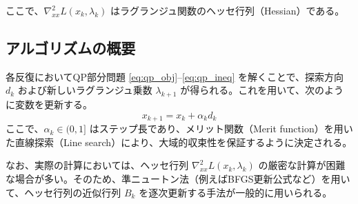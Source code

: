 ここで、$\nabla_{xx}^2 L(x_k, \lambda_k)$ はラグランジュ関数のヘッセ行列（Hessian）である。

\subsection{アルゴリズムの概要}
各反復においてQP部分問題 \eqref{eq:qp_obj}--\eqref{eq:qp_ineq} を解くことで、探索方向 $d_k$ および新しいラグランジュ乗数 $\lambda_{k+1}$ が得られる。これを用いて、次のように変数を更新する。
\begin{equation}
    x_{k+1} = x_k + \alpha_k d_k
\end{equation}
ここで、$\alpha_k \in (0, 1]$ はステップ長であり、メリット関数（Merit function）を用いた直線探索（Line search）により、大域的収束性を保証するように決定される。

なお、実際の計算においては、ヘッセ行列 $\nabla_{xx}^2 L(x_k, \lambda_k)$ の厳密な計算が困難な場合が多い。そのため、準ニュートン法（例えばBFGS更新公式など）を用いて、ヘッセ行列の近似行列 $B_k$ を逐次更新する手法が一般的に用いられる。
